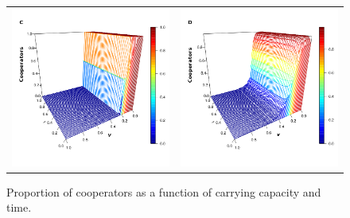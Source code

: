 \documentclass[11pt]{article}
\begin{document}
\begin{figure} [h!]
\begin{tabular}{cc}
  \\
  \includegraphics[scale=0.28]{images/barabasi_dc_nus_1.png} & \includegraphics[scale=0.28]{images/fosiss_dc_nus_1.png}
\end{tabular}
\caption{Proportion of cooperators as a function of carrying capacity and time.}\label{CD}
\end{figure}
\end{document}

